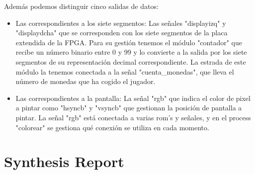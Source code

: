 \documentclass[11pt, a4paper, spanish, openright, twoside]{book}
\begin{document}
	Además podemos distinguir cinco salidas de datos:
	\begin{itemize}
	\item Las correspondientes a los siete segmentos: Las señales "displayizq" y "displaydcha" que se corresponden con los siete segmentos de la placa extendida de la FPGA. Para su gestión tenemos el módulo "contador" que recibe un número
	binario entre 0 y 99 y lo convierte a la salida por los siete segmentos de su representación decimal correspondiente. La estrada de este módulo la tenemos conectada a la señal "cuenta\_monedas", que lleva el número de monedas que ha 
	cogido el jugador.
	\item Las correspondientes a la pantalla: La señal "rgb" que indica el color de pixel a pintar como "hsyncb" y "vsyncb" que gestionan la posición de pantalla a pintar. La señal "rgb" está conectada a varias rom's y señales, y en el process "colorear" se 
	gestiona qué conexión se utiliza en cada momento.
	
\end{itemize}


\section{Synthesis Report}
\end{document}
